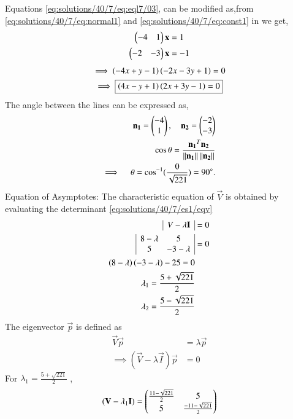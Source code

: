 Equations \eqref{eq:solutions/40/7/eq:eql7/03}, can be modified as,from \eqref{eq:solutions/40/7/eq:normal1} and \eqref{eq:solutions/40/7/eq:const1} in we get,
\begin{align}
    \begin{pmatrix}-4 & 1\end{pmatrix}\mathbf{x}&=1\\
    \begin{pmatrix}-2 & -3\end{pmatrix}\mathbf{x}&=-1
\end{align}
\begin{multline}
\implies \left(-4x+y-1\right)\left(-2x-3y+1\right)= 0\\
\implies \boxed{\left(4x-y+1\right)\left(2x+3y-1\right) = 0} \label{eq:solutions/40/7/eq:line1}
\end{multline}
The angle between the lines can be expressed as, 
\begin{align}
	\mathbf{n_1}=\begin{pmatrix}-4\\1\end{pmatrix} , \quad \mathbf{n_2}=\begin{pmatrix}-2\\-3\end{pmatrix}\\
	\cos\theta=\frac{\mathbf{n_1}^T\mathbf{n_2}}{\left\lVert\mathbf{n_1}\right\rVert\left\lVert\mathbf{n_2}\right\rVert} \\
	\implies \quad \theta=\cos^{-1}({\frac{0}{\sqrt{221}}}) = 90\degree.
\end{align}
{Equation of Asymptotes: }
The characteristic equation of $\vec{V}$ is obtained by evaluating the determinant \eqref{eq:solutions/40/7/es1/eqv}
\begin{align}
       \begin{array}{|c|}
V-\lambda\mathbf{I}
\end{array}&=0\\
   \begin{array}{|cc|}
8-\lambda & 5 \\ 5 & -3-\lambda
\end{array}&=0\\
    \left(8-\lambda\right)\left(-3-\lambda\right)-25=0\\
    \lambda_{1}= \frac{5+\sqrt{221}}{2}\\
    \lambda_{2}= \frac{5-\sqrt{221}}{2}
\end{align}
The eigenvector $\vec{p}$ is defined as 
\begin{align}
    \vec{V}\vec{p}&=\lambda\vec{p}\\
    \implies (\vec{V}-\lambda\vec{I})\vec{p}&=0\label{eq:solutions/40/7/eq:es/2701}
\end{align}
For $\lambda_1=\frac{5+\sqrt{221}}{2}$ ,
\begin{align}
    (\mathbf{V}-\lambda_1\mathbf{I})=\begin{pmatrix}\frac{11-\sqrt{221}}{2} & 5 \\5 & \frac{-11-\sqrt{221}}{2}\end{pmatrix}
\end{align}
